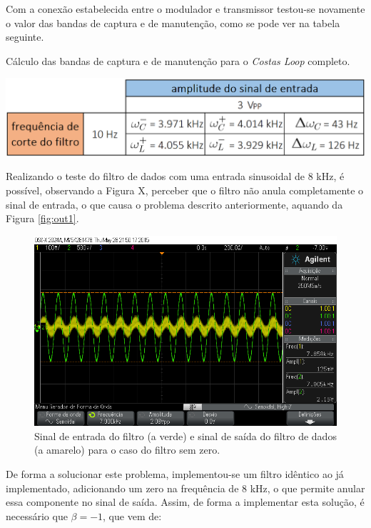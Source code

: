 \documentclass[11pt]{article}
\numberwithin{equation}{section}
\begin{document}

Com a conexão estabelecida entre o modulador e transmissor testou-se novamente o valor das bandas de captura e de manutenção, como se pode ver na tabela seguinte.

\begin{table}[H]
	\centering
	\caption{Cálculo das bandas de captura e de manutenção para o \textit{Costas Loop} completo.}
	\vspace{-1.5mm}
	\includegraphics[keepaspectratio=true, scale=0.35]{tabelas/bandascompleto}
\end{table}


Realizando o teste do filtro de dados com uma entrada sinusoidal de 8 kHz, é possível, observando a Figura X, perceber que o filtro não anula completamente o sinal de entrada, o que causa o problema descrito anteriormente, aquando da Figura \ref{fig:out1}.

\begin{figure}[H]
	\centering
	\includegraphics[keepaspectratio=true, scale=0.37]{exps/FiltroSemZero8k}
	\caption{Sinal de entrada do filtro (a verde) e sinal de saída do filtro de dados (a amarelo) para o caso do filtro sem zero.}
	\vspace{-0.8em}
\end{figure} 

De forma a solucionar este problema, implementou-se um filtro idêntico ao já implementado, adicionando um zero na frequência de 8 kHz, o que permite anular essa componente no sinal de saída. Assim, de forma a implementar esta solução, é necessário que $\beta = -1$, que vem de:
\end{document}
